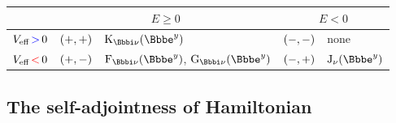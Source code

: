 \documentclass[8pt]{beamer}
\begin{document}
\begin{frame}
\begin{center}
\begin{tabular}{c||r@{; }l|r@{; }l}
\toprule
& \multicolumn{2}{c}{$E \ge 0$} & \multicolumn{2}{|c}{$E < 0$} \\
\midrule
$V_{\text{eff}}\,\textcolor{blue}{>}\,0$ &
${\left(+,+\right)}$ & $\rfun{\BesselK_{\ii \nu}}{\ee^{y}}$ &
${\left(-,-\right)}$ & none \\
$V_{\text{eff}}\,\textcolor{red}{<}\,0$ &
${\left(+,-\right)}$ &
$\rfun{\BesselF_{\ii \nu}}{\ee^{y}}$,
$\rfun{\BesselG_{\ii \nu}}{\ee^{y}}$ &
${\left(-,+\right)}$& $\rfun{\BesselJ_{\nu}}{\ee^{y}}$ \\
\bottomrule
\end{tabular}
\end{center}

\end{frame}

\subsection{The self-adjointness of Hamiltonian}
\end{document}
